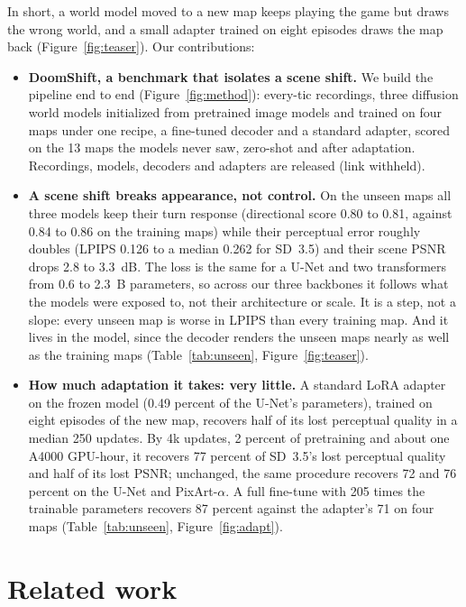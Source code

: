 \documentclass{article}
\begin{document}
In short, a world model moved to a new map keeps playing the game but draws the wrong world, and a small adapter trained on eight episodes draws the map back (Figure~\ref{fig:teaser}). Our contributions:
\begin{itemize}\setlength{\itemsep}{0pt}
\item \textbf{DoomShift, a benchmark that isolates a scene shift.} We build the pipeline end to end (Figure~\ref{fig:method}): every-tic recordings, three diffusion world models initialized from pretrained image models and trained on four maps under one recipe, a fine-tuned decoder and a standard adapter, scored on the 13 maps the models never saw, zero-shot and after adaptation. Recordings, models, decoders and adapters are released (link withheld).
\item \textbf{A scene shift breaks appearance, not control.} On the unseen maps all three models keep their turn response (directional score 0.80 to 0.81, against 0.84 to 0.86 on the training maps) while their perceptual error roughly doubles (LPIPS 0.126 to a median 0.262 for SD~3.5) and their scene PSNR drops 2.8 to 3.3~dB. The loss is the same for a U-Net and two transformers from 0.6 to 2.3~B parameters, so across our three backbones it follows what the models were exposed to, not their architecture or scale. It is a step, not a slope: every unseen map is worse in LPIPS than every training map. And it lives in the model, since the decoder renders the unseen maps nearly as well as the training maps (Table~\ref{tab:unseen}, Figure~\ref{fig:teaser}).
\item \textbf{How much adaptation it takes: very little.} A standard LoRA adapter on the frozen model (0.49 percent of the U-Net's parameters), trained on eight episodes of the new map, recovers half of its lost perceptual quality in a median 250 updates. By 4k updates, 2 percent of pretraining and about one A4000 GPU-hour, it recovers 77 percent of SD~3.5's lost perceptual quality and half of its lost PSNR; unchanged, the same procedure recovers 72 and 76 percent on the U-Net and PixArt-$\alpha$. A full fine-tune with 205 times the trainable parameters recovers 87 percent against the adapter's 71 on four maps (Table~\ref{tab:unseen}, Figure~\ref{fig:adapt}).
\end{itemize}



\section{Related work}
\label{sec:related}
\end{document}
